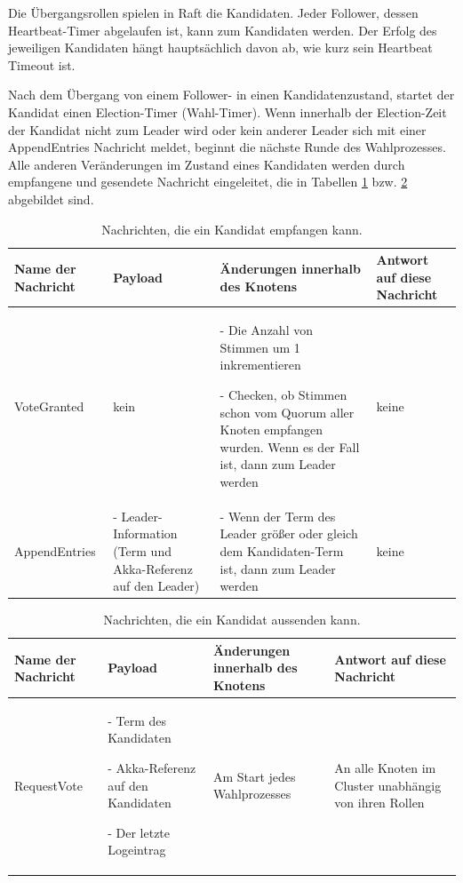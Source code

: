 Die Übergangsrollen spielen in Raft die Kandidaten. Jeder Follower, dessen Heartbeat-Timer abgelaufen ist, kann zum Kandidaten werden. Der Erfolg des jeweiligen Kandidaten hängt hauptsächlich davon ab, wie kurz sein Heartbeat Timeout ist.

Nach dem Übergang von einem Follower- in einen Kandidatenzustand, startet der Kandidat einen Election-Timer (Wahl-Timer). Wenn innerhalb der Election-Zeit der Kandidat nicht zum Leader wird oder kein anderer Leader sich mit einer AppendEntries Nachricht meldet, beginnt die nächste Runde des Wahlprozesses. Alle anderen Veränderungen im Zustand eines Kandidaten werden durch empfangene und gesendete Nachricht eingeleitet, die in Tabellen \ref{tab:candidateReceive} bzw. \ref{tab:candidateSend} abgebildet sind.

\begin{table} \centering
	\begin{tabular}{|p{2.5cm}|p{3.5cm}|p{4cm}|p{4.5cm}|} 
		\hline
		\textbf{Name der Nachricht} & \textbf{Payload} & \textbf{Änderungen innerhalb des Knotens} & \textbf{Antwort auf diese Nachricht}\\
		
		\hline
		VoteGranted & kein & - Die Anzahl von Stimmen um 1 inkrementieren
		
		- Checken, ob Stimmen schon vom Quorum aller Knoten empfangen wurden. Wenn es der Fall ist, dann zum Leader werden
		 & keine\\
		
		\hline
		AppendEntries & - Leader-Information (Term und Akka-Referenz auf den Leader) 
		& - Wenn der Term des Leader größer oder gleich dem Kandidaten-Term ist, dann zum Leader werden & keine\\
		
		\hline
	\end{tabular}
	\caption{Nachrichten, die ein Kandidat empfangen kann.}
	\label{tab:candidateReceive}
\end{table}

\begin{table} \centering
	\begin{tabular}{|p{2.5cm}|p{3.5cm}|p{4cm}|p{4.5cm}|} 
		\hline
		\textbf{Name der Nachricht} & \textbf{Payload} & \textbf{Änderungen innerhalb des Knotens} & \textbf{Antwort auf diese Nachricht}\\
		
		\hline
		RequestVote & - Term des Kandidaten
		
		- Akka-Referenz auf den Kandidaten
		
		- Der letzte Logeintrag
		 & Am Start jedes Wahlprozesses & An alle Knoten im Cluster unabhängig von ihren Rollen\\
		
		\hline
	\end{tabular}
	\caption{Nachrichten, die ein Kandidat aussenden kann.}
	\label{tab:candidateSend}
\end{table}

